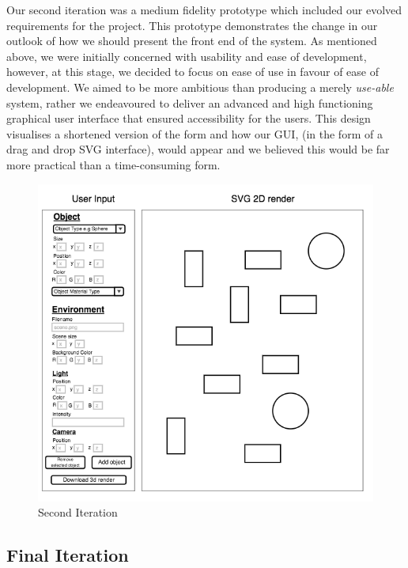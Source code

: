 \documentclass[a4paper]{report}
\begin{document}
	Our second iteration was a medium fidelity prototype which included our evolved requirements for the project. This prototype demonstrates the change in our outlook of how we should present the front end of the system. As mentioned above, we were initially concerned with usability and ease of development, however, at this stage, we decided to focus on ease of use in favour of ease of development. We aimed to be more ambitious than producing a merely \textit{use-able} system, rather we endeavoured to deliver an advanced and high functioning graphical user interface that ensured accessibility for the users. This design visualises a shortened version of the form and how our GUI, (in the form of a drag and drop SVG interface), would appear and we believed this would be far more practical than a time-consuming form.
	
	\begin{figure}[ht!]
		\centering
		\includegraphics[scale=0.8]{second_prototype.png}
		\caption{Second Iteration}
		\label{fig:secondIt}
	\end{figure}
	
	\subsection{Final Iteration}
	
\end{document}

